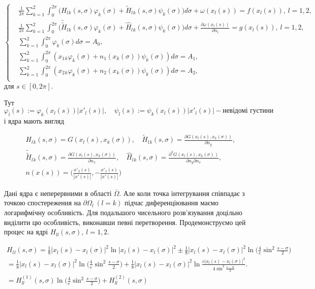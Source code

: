 \documentclass[12pt]{report}
\begin{document}
 \begin{equation}
 		\left\{
	 	\begin{split}
		\label{paramSystem}
	 		&\frac{1}{2\pi}\sum_{k=1}^{2}\int_{0}^{2\pi}\bigg(H_l{_k}(s, \sigma)\varphi_k(\sigma)+\tilde{H}_l{_k}(s, \sigma)\psi_k(\sigma)\bigg)d\sigma+\omega(x_l(s))=f(x_l(s)), \ l=1,2, \\
			&\frac{1}{2\pi}\sum_{k=1}^{2}\int_{0}^{2\pi}\bigg(\tilde{\tilde{H}}_l{_k}(s, \sigma)\varphi_k(\sigma)+\hat{H}_l{_k}(s, \sigma)\psi_k(\sigma)\bigg)d\sigma+\frac{\partial\omega(x_l(s))}{\partial n_l}=g(x_l(s)), \ l=1,2, \\
			&\sum_{k=1}^{2}\int_{0}^{2\pi}\varphi_k(\sigma)d\sigma=A_0, \\
			&\sum_{k=1}^{2}\int_{0}^{2\pi}(x_1{_k}\varphi_k(\sigma)+n_1(x_k(\sigma))\psi_k(\sigma))d\sigma=A_1, \\
			&\sum_{k=1}^{2}\int_{0}^{2\pi}(x_2{_k}\varphi_k(\sigma)+n_2(x_k(\sigma))\psi_k(\sigma))d\sigma=A_2, \\
		\end{split}
		\right.
\end{equation}
для $s\in [0,2\pi]$.

Тут $ \label{kernels} \varphi_l(s) :=\varphi_k(x_l(s))|x'_l(s)|, \quad \psi_l(s) :=\psi_k(x_l(s))|x'_l(s)| - \textrm{невідомі густини} $ і ядра мають вигляд
 
 \begin{equation}
 \begin{split}
	&H_l{_k}(s, \sigma) = G(x_l(s),x_k(\sigma)), \quad \tilde{H}_l{_k}(s, \sigma)=\frac{\partial G(x_l(s),x_k(\sigma))}{\partial n_y}, \\
	&\tilde{\tilde{H}}_l{_k}(s, \sigma)=\frac{\partial G(x_l(s),x_k(\sigma))}{\partial n_x}, \quad \hat{H}_l{_k}(s, \sigma)=\frac{\partial^2 G(x_l(s),x_k(\sigma))}{\partial n_y\partial n_x}, \\
	&n(x(s))=\Big(\frac{x'_2(s)}{|x'(s)|},-\frac{x'_1(s)}{|x'(s)|}\Big) \nonumber
 \end{split}
 \end{equation}
 
 Дані ядра є неперервними в області $\bar{\Omega}$. Але коли точка інтегрування співпадає з точкою спостереження на $\partial\Omega_l \ (l=k)$ підчас диференціювання маємо логарифмічну особливість. Для подальшого чисельного розв'язування доцільно виділити цю особливість, виконавши певні перетворення. Продемонструємо цей процес на ядрі $H_{ll}(s, \sigma), \ l=1,2$.
 
 \begin{gather*}
 	H_l{_l}(s, \sigma)=\frac{1}{8}|x_l(s)-x_l(\sigma)|^2\ln|x_l(s)-x_l(\sigma)|^2\pm \frac{1}{8}|x_l(s)-x_l(\sigma)|^2\ln\bigg(\frac{4}{e}\sin^2\frac{s-\sigma}{2}\bigg) \\
	=\frac{1}{8}|x_l(s)-x_l(\sigma)|^2\ln\bigg(\frac{4}{e}\sin^2\frac{s-\sigma}{2}\bigg)+\frac{1}{8}|x_l(s)-x_l(\sigma)|^2\ln\frac{e|x_l(s)-x_l(\sigma)|^2}{4\sin^2\frac{s-\sigma}{2}}. \\
	=H^{(1)}_{ll}(s, \sigma)\ln\bigg(\frac{4}{e}\sin^2\frac{s-\sigma}{2}\bigg)+H^{(2)}_{ll}(s, \sigma)
 \end{gather*}
 
\end{document}
